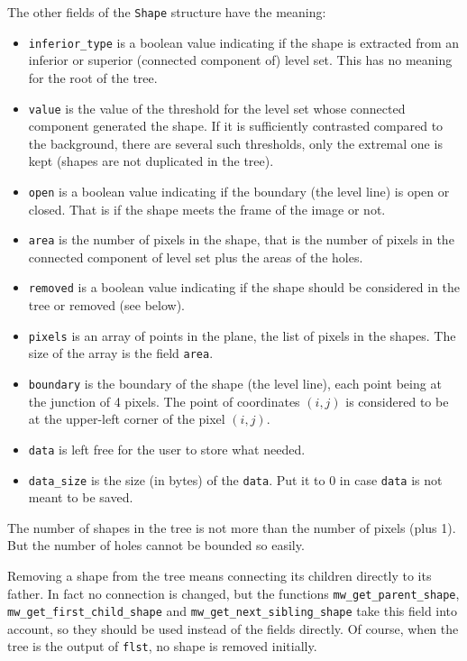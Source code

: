 The other fields of the \texttt{Shape} structure have the meaning:
\begin{itemize}
\item \texttt{inferior\_type} is a boolean value indicating if the shape is
extracted from an inferior or superior (connected component of) level
set. This has no meaning for the root of the tree.
\item \texttt{value} is the value of the threshold for the level set whose
connected component generated the shape. If it is sufficiently contrasted
compared to the background, there are several such thresholds, only the
extremal one is kept (shapes are not duplicated in the tree).
\item \texttt{open} is a boolean value indicating if the boundary (the level
line) is open or closed. That is if the shape meets the frame of the image or
not.
\item \texttt{area} is the number of pixels in the shape, that is the number
of pixels in the connected component of level set plus the areas of the holes.
\item \texttt{removed} is a boolean value indicating if the shape should be
considered in the tree or removed (see below).
\item \texttt{pixels} is an array of points in the plane, the list of pixels
in the shapes. The size of the array is the field \texttt{area}.
\item \texttt{boundary} is the boundary of the shape (the level line), each
point being at the junction of 4 pixels. The point of coordinates $(i,j)$ is
considered to be at the upper-left corner of the pixel $(i,j)$.
\item \texttt{data} is left free for the user to store what needed.
\item \texttt{data\_size} is the size (in bytes) of the \texttt{data}. Put it
to 0 in case \texttt{data} is not meant to be saved.
\end{itemize}

The number of shapes in the tree is not more than the number of pixels (plus
1). But the number of holes cannot be bounded so easily.

Removing a shape from the tree means connecting its children directly to its
father. In fact no connection is changed, but the functions
\texttt{mw\_get\_parent\_shape}, \texttt{mw\_get\_first\_child\_shape} and
\texttt{mw\_get\_next\_sibling\_shape} take this field into account, so they
should be used instead of the fields directly. Of course, when the tree is the
output of \texttt{flst}, no shape is removed initially.


